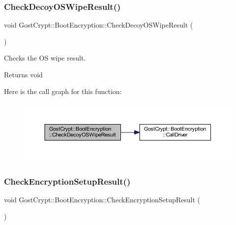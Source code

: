 \mbox{\label{class_gost_crypt_1_1_boot_encryption_aa730c1ebbc354863f3e32b2ff38a16dc}} 
\subsubsection{\texorpdfstring{Check\+Decoy\+O\+S\+Wipe\+Result()}{CheckDecoyOSWipeResult()}}
{\footnotesize\ttfamily void Gost\+Crypt\+::\+Boot\+Encryption\+::\+Check\+Decoy\+O\+S\+Wipe\+Result (\begin{DoxyParamCaption}{ }\end{DoxyParamCaption})}



Checks the OS wipe result. 

\begin{DoxyReturn}{Returns}
void 
\end{DoxyReturn}
Here is the call graph for this function\+:
\nopagebreak
\begin{figure}[H]
\begin{center}
\leavevmode
\includegraphics[width=350pt]{class_gost_crypt_1_1_boot_encryption_aa730c1ebbc354863f3e32b2ff38a16dc_cgraph}
\end{center}
\end{figure}
\mbox{\label{class_gost_crypt_1_1_boot_encryption_ac584bf7946ae3ac2d35fb38fcfbb615a}} 
\subsubsection{\texorpdfstring{Check\+Encryption\+Setup\+Result()}{CheckEncryptionSetupResult()}}
{\footnotesize\ttfamily void Gost\+Crypt\+::\+Boot\+Encryption\+::\+Check\+Encryption\+Setup\+Result (\begin{DoxyParamCaption}{ }\end{DoxyParamCaption})}



